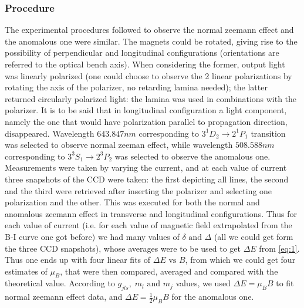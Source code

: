 \documentclass[a4paper,12pt,abstracton]{scrartcl}
\begin{document}
\subsubsection{Procedure} \label{subsec:1}
The experimental procedures followed to observe the normal zeemann effect and the anomalous one were similar. The magnets could be rotated, giving rise to the possibility of perpendicular and longitudinal configurations (orientations are referred to the optical bench axis). When considering the former, output light was linearly polarized (one could choose to observe the 2 linear polarizations by rotating the axis of the polarizer, no retarding lamina needed); the latter returned circularly polarized light: the lamina was used in combinations with the polarizer. It is to be said that in longitudinal configuration a light component, namely the one that would have polarization parallel to propagation direction, disappeared.\newline
Wavelength $643.847 nm$ corresponding to $3 ^{1}D_{2} \longrightarrow 2 ^{1}P_{1}$  transition was selected to observe normal zeeman effect, while wavelength $508.588 nm$ corresponding to $3 ^3S_1 \longrightarrow 2 ^3P_2$ was selected to observe the anomalous one. \newline
Measurements were taken by varying the current, and at each value of current three snapshots of the CCD were taken: the first depicting all lines, the second and the third were retrieved after inserting the polarizer and selecting one polarization and the other. This was executed for both the normal and anomalous zeemann effect in transverse and longitudinal configurations.\newline
Thus for each value of current (i.e. for each value of magnetic field extrapolated from the B-I curve one got before) we had many values of $\delta \text{ and } \Delta $ (all we could get form the three CCD snapshots), whose averages were to be used to get $\Delta E$ from \ref{eq:1}.
Thus one ends up with four linear fits of $\Delta E \text{ vs } B$, from which we could get four estimates of $\mu_B$, that were then compared, averaged and compared with the theoretical value. According to $g_{jls} , \; m_l \text{ and } m_j$ values, we used $\Delta E = \mu_B B$ to fit normal zeemann effect data, and $\Delta E =\frac{1}{2} \mu_B B$ for the anomalous one.
  
\setlength{\columnsep}{27pt} 
\begin{multicols}{2}
\printnomenclature
\end{multicols}
\newpage


%
%
\end{document}
